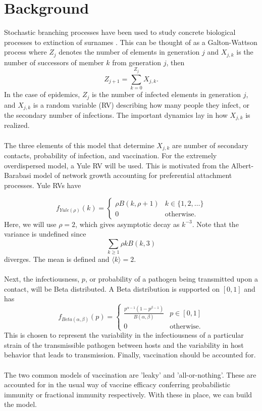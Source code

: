 \documentclass[11pt, twocolumn]{article}
\begin{document}
\section*{Background}
Stochastic branching processes have been used to study concrete biological processes to extinction of surnames \cite{10.1112/blms/7.3.225}. This can be thought of as a Galton-Wattson process where $Z_j$ denotes the number of elements in generation $j$ and $X_{j, k}$ is the number of successors of member $k$ from generation $j$, then 
\begin{equation}
	Z_{j+1} = \sum_{k=0}^{Z_j}X_{j,k}. \label{eqn:GW}
\end{equation}
In the case of epidemics, $Z_j$ is the number of infected elements in generation $j$, and $X_{j, k}$ is a random variable (RV) describing how many people they infect, or the secondary number of infections. The important dynamics lay in how $X_{j,k}$ is realized.\\ \\
The three elements of this model that determine $X_{j,k}$ are number of secondary contacts, probability of infection, and vaccination. For the extremely overdispersed model, a Yule RV will be used. This is motivated from the Albert-Barabasi model of network growth accounting for preferential attachment processes. Yule RVs have

\begin{equation}
	f_{Yule(\rho)}(k)=
	\begin{cases}
		\rho B(k, \rho+1)& k \in \{1, 2, \ldots\}\\
		0&\text{otherwise}.
	\end{cases}
\end{equation}
Here, we will use $\rho=2$, which gives asymptotic decay as $k^{-3}$. Note that the variance is undefined since
\begin{equation}
	\sum_{k\geq 1}\rho k B(k, 3)
\end{equation}
diverges. The mean is defined and $\langle k \rangle =2$. \\ \\
Next, the infectiousness, $p$, or probability of a pathogen being transmitted upon a contact, will be Beta distributed. A Beta distribution is supported on $[0,1]$ and has
\begin{equation}
	f_{Beta(\alpha, \beta)}(p)=\begin{cases}
	\frac{p^{\alpha-1}(1-p^{\beta-1})}{B(\alpha, \beta)}&p\in[0,1]\\
	0&\text{otherwise}.
	\end{cases}
\end{equation}
This is chosen to represent the variability in the infectiousness of a particular strain of the transmissible pathogen between hosts and the variability in host behavior that leads to transmission. Finally, vaccination should be accounted for. \\ \\
The two common models of vaccination are 'leaky' and 'all-or-nothing'. These are accounted for in the usual way of vaccine efficacy conferring probabilistic immunity or fractional immunity respectively. With these in place, we can build the model.
\end{document}
